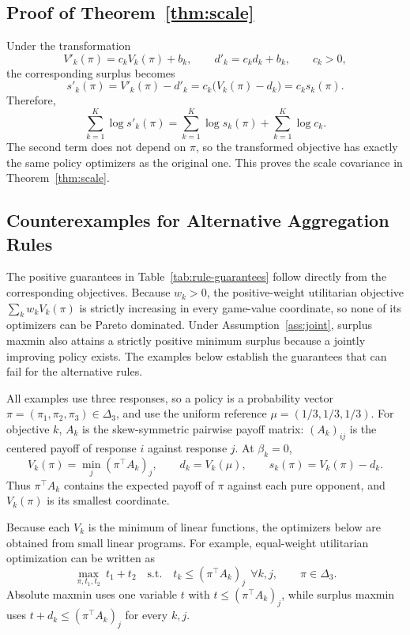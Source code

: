 \documentclass{article}
\theoremstyle{remark}
\theoremstyle{plain}
\begin{document}
\subsection{Proof of Theorem~\ref{thm:scale}}
\label{app:scale}

Under the transformation
\[
V'_k(\pi)=c_kV_k(\pi)+b_k,
\qquad
d'_k=c_kd_k+b_k,
\qquad c_k>0,
\]
the corresponding surplus becomes
\[
s'_k(\pi)
=
V'_k(\pi)-d'_k
=
c_k\bigl(V_k(\pi)-d_k\bigr)
=
c_ks_k(\pi).
\]
Therefore,
\[
\sum_{k=1}^K\log s'_k(\pi)
=
\sum_{k=1}^K\log s_k(\pi)
+
\sum_{k=1}^K\log c_k.
\]
The second term does not depend on $\pi$, so the transformed objective
has exactly the same policy optimizers as the original one. This proves
the scale covariance in Theorem~\ref{thm:scale}.

\subsection{Counterexamples for Alternative Aggregation Rules}
\label{app:rule-witnesses}

The positive guarantees in Table~\ref{tab:rule-guarantees} follow
directly from the corresponding objectives. Because $w_k>0$, the
positive-weight utilitarian objective $\sum_k w_k V_k(\pi)$ is strictly
increasing in every game-value coordinate, so none of its optimizers can
be Pareto dominated. Under Assumption~\ref{ass:joint}, surplus maxmin
also attains a strictly positive minimum surplus because a jointly
improving policy exists. The examples below establish the guarantees
that can fail for the alternative rules.

All examples use three responses, so a policy is a probability vector
$\pi=(\pi_1,\pi_2,\pi_3)\in\Delta_3$, and use the uniform reference
$\mu=(1/3,1/3,1/3)$. For objective $k$, $A_k$ is the skew-symmetric
pairwise payoff matrix: $(A_k)_{ij}$ is the centered payoff of response
$i$ against response $j$. At $\beta_k=0$,
\[
V_k(\pi)
=
\min_j(\pi^\top A_k)_j,
\qquad
d_k=V_k(\mu),
\qquad
s_k(\pi)=V_k(\pi)-d_k.
\]
Thus $\pi^\top A_k$ contains the expected payoff of $\pi$ against each
pure opponent, and $V_k(\pi)$ is its smallest coordinate.

Because each $V_k$ is the minimum of linear functions, the optimizers
below are obtained from small linear programs. For example,
equal-weight utilitarian optimization can be written as
\[
\max_{\pi,t_1,t_2}\ t_1+t_2
\quad\text{s.t.}\quad
t_k\le(\pi^\top A_k)_j
\ \ \forall k,j,\qquad
\pi\in\Delta_3.
\]
Absolute maxmin uses one variable $t$ with
$t\le(\pi^\top A_k)_j$, while surplus maxmin uses
$t+d_k\le(\pi^\top A_k)_j$ for every $k,j$.
\end{document}
